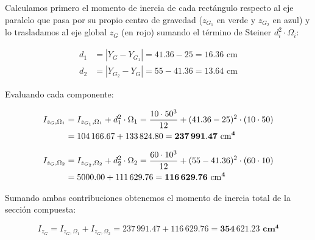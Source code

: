 {\begin{itemize}
    \end{itemize}






    Calculamos primero el momento de inercia de cada rectángulo respecto al eje paralelo que pasa por su propio centro de gravedad ($z_{G_1}$ en verde y $z_{G_2}$ en azul) y lo trasladamos al eje global $z_G$ (en rojo) sumando el término de Steiner $d_i^2 \cdot \Omega_i$:

    \begin{align}
        d_1 & = |Y_G - Y_{G_1}| = 41.36 - 25 = 16.36\text{ cm} \\
        d_2 & = |Y_{G_2} - Y_G| = 55 - 41.36 = 13.64\text{ cm}
\end{align}

    Evaluando cada componente:

    \begin{align}
        I_{z_G, \Omega_1} & = I_{z_{G_1}, \Omega_1} + d_1^2 \cdot \Omega_1 = \frac{10 \cdot 50^3}{12} + (41.36 - 25)^2 \cdot (10 \cdot 50) \notag \\
                          & = 104\,166.67 + 133\,824.80 = \mathbf{237\,991.47\text{ cm}^4}                                                        \\[6pt]
        I_{z_G, \Omega_2} & = I_{z_{G_2}, \Omega_2} + d_2^2 \cdot \Omega_2 = \frac{60 \cdot 10^3}{12} + (55 - 41.36)^2 \cdot (60 \cdot 10) \notag \\
                          & = 5000.00 + 111\,629.76 = \mathbf{116\,629.76\text{ cm}^4}
\end{align}

    Sumando ambas contribuciones obtenemos el momento de inercia total de la sección compuesta:

    \begin{equation}
        I_{z_G} = I_{z_G, \Omega_1} + I_{z_G, \Omega_2} = 237\,991.47 + 116\,629.76 = \mathbf{354\,621.23\text{ cm}^4}
\end{equation}

}



